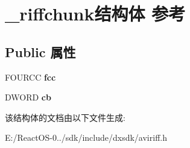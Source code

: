 \hypertarget{struct__riffchunk}{}\section{\+\_\+riffchunk结构体 参考}
\label{struct__riffchunk}
\subsection*{Public 属性}
\begin{DoxyCompactItemize}
\item 
\mbox{\label{struct__riffchunk_a6316e2732985cfa38a818c31cebee6e9}} 
F\+O\+U\+R\+CC {\bfseries fcc}
\item 
\mbox{\label{struct__riffchunk_acdaf661aae0415ac928d1d386dc056de}} 
D\+W\+O\+RD {\bfseries cb}
\end{DoxyCompactItemize}


该结构体的文档由以下文件生成\+:\begin{DoxyCompactItemize}
\item 
E\+:/\+React\+O\+S-\/0../sdk/include/dxsdk/aviriff.\+h\end{DoxyCompactItemize}
